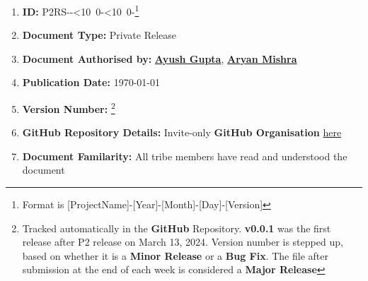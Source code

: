 \renewcommand{\thefootnote}{\alph{footnote}}
\def\mydate{\leavevmode\hbox{\the\year-\twodigits\month-\twodigits\day}}
\def\twodigits#1{\ifnum#1<10 0\fi\the#1}
\begin{enumerate}[itemsep = 0.1 pt]
\item{
\textbf{ID:} \hypertarget{Target_DocInfo}{P2RS-\mydate-}\footnote{Format is [ProjectName]-[Year]-[Month]-[Day]-[Version]}
}
      \item{
            \textbf{Document Type:} Private Release
            }

      \item{
            \textbf{Document Authorised by:} \textbf{\href{mailto:mt1210697@maths.iitd.ac.in}{Ayush Gupta}}, \href{mailto:ee1210137@ee.iitd.ac.in}{\textbf{Aryan Mishra}}}

      \item{
            \textbf{Publication Date:} \today
            }

      \item
            {
            \textbf{Version Number:} \hypertarget{Target_Ver}{}\footnote{Tracked automatically in the \textbf{GitHub} Repository.
                  \textbf{v0.0.1} was the first release after P2 release on March 13, 2024.
                  Version number is stepped up, based on whether it is a \textbf{Minor Release} or a \textbf{Bug Fix}.
                  The file after submission at the end of each week is considered a \textbf{Major Release}}
            }

      \item{\textbf{GitHub Repository Details:} Invite-only \textbf{GitHub Organisation}
            \href{https://github.com/ELP305-Cleaning-Machine}{here}
            }
        \item{\textbf{Document Familarity:} All tribe members have read and understood the document}
\end{enumerate}
